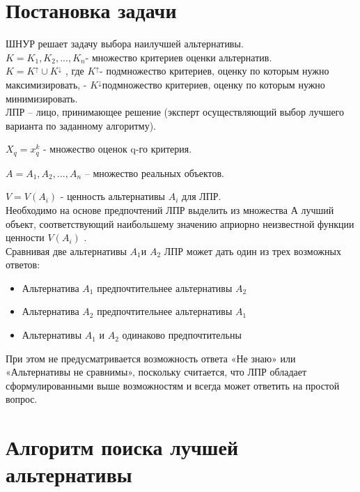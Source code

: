 \documentclass[a4paper, 14pt]{report}
\begin{document}
\section{Постановка задачи}

	ШНУР решает задачу выбора наилучшей альтернативы.\\
	
	$K = {K_{1},K_{2}, ..., K_{n}} $- множество критериев оценки альтернатив.\\
	
	$K =K^{\uparrow} \cup K^{\downarrow}$ , где $K^{\uparrow} $- подмножество критериев, оценку по которым нужно максимизировать,  - $K^{\downarrow}$подмножество критериев, оценку по которым нужно минимизировать. \\
	
	ЛПР – лицо, принимающее решение (эксперт осуществляющий выбор лучшего варианта по заданному алгоритму).
	
	$X_{q}={x^{k}_{q}}$ - множество оценок q-го критерия. 
	
	$A={A_{1},A_{2}, ..., A_{n}}$ – множество реальных объектов.
	
	$V=V(A_{i})$ - ценность альтернативы $A_{i}$ для ЛПР. \\
	
	Необходимо на основе предпочтений ЛПР выделить из множества А лучший объект, соответствующий наибольшему значению априорно неизвестной функции ценности $V(A_{i})$ .\\
	
	Сравнивая две альтернативы $A_{1} $и $A_{2}$ ЛПР может дать один из трех возможных ответов:
	\begin{itemize}
		\item Альтернатива $A_{1}$ предпочтительнее альтернативы  $A_{2}$ 
		\item Альтернатива  $A_{2}$  предпочтительнее альтернативы  $A_{1}$ 
		\item Альтернативы  $A_{1}$  и  $A_{2}$  одинаково предпочтительны
	\end{itemize}

	При этом не предусматривается возможность ответа «Не знаю» или «Альтернативы не сравнимы», поскольку считается, что ЛПР обладает сформулированными выше возможностям и всегда может ответить на простой вопрос.

\section{Алгоритм поиска лучшей альтернативы}
\end{document}
